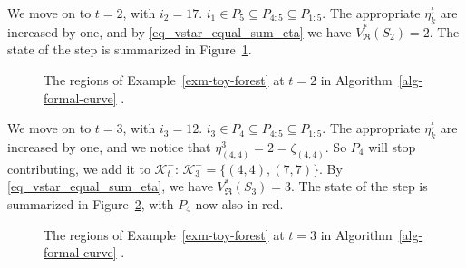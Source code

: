 \documentclass[
  11pt,
  a4paper,
]{article}
\theoremstyle{plain}
\theoremstyle{plain}
\theoremstyle{plain}
\theoremstyle{definition}
\theoremstyle{definition}
\theoremstyle{remark}
\begin{document}
We move on to \(t=2\), with \(i_2=17\).
\(i_1\in P_5\subseteq P_{4:5}\subseteq P_{1:5}\). The appropriate
\(\eta_k^t\) are increased by one, and by \eqref{eq_vstar_equal_sum_eta}
we have \(V^*_{\mathfrak{R}}(S_2)=2\). The state of the step is
summarized in Figure~\ref{fig-t2}.

\begin{figure}


\caption{\label{fig-t2}The regions of Example~\ref{exm-toy-forest} at
\(t=2\) in  Algorithm~\ref{alg-formal-curve} .}

\end{figure}%

We move on to \(t=3\), with \(i_3=12\).
\(i_3\in P_4\subseteq P_{4:5}\subseteq P_{1:5}\). The appropriate
\(\eta_k^t\) are increased by one, and we notice that
\(\eta_{(4, 4)}^3=2=\zeta_{(4, 4)}\). So \(P_4\) will stop contributing,
we add it to \(\mathcal{K}^-_t\):
\(\mathcal{K}^-_3=\{(4, 4), (7, 7)\}\). By
\eqref{eq_vstar_equal_sum_eta}, we have \(V^*_{\mathfrak{R}}(S_3)=3\).
The state of the step is summarized in Figure~\ref{fig-t3}, with \(P_4\)
now also in red.

\begin{figure}


\caption{\label{fig-t3}The regions of Example~\ref{exm-toy-forest} at
\(t=3\) in  Algorithm~\ref{alg-formal-curve} .}

\end{figure}%
\end{document}
